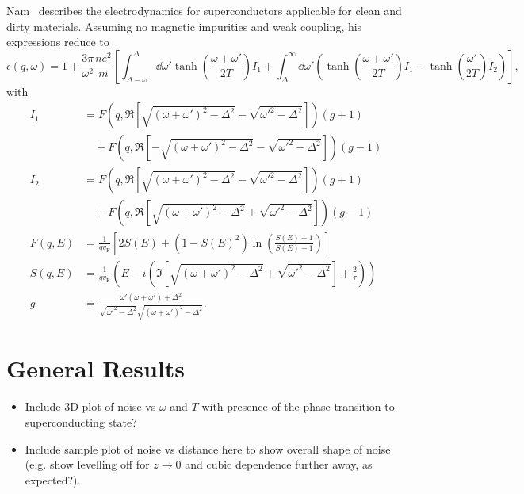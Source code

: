 \documentclass{article}
\newcommand{\vf}{v_{\mathrm{F}}}
\begin{document}
	Nam~\cite{Nam1967} describes the electrodynamics for superconductors applicable for clean and dirty materials.
	Assuming no magnetic impurities and weak coupling, his expressions reduce to
	\begin{equation}
		\epsilon(q, \omega) = 1 + \frac{3 \pi}{\omega^2} \frac{n e^2}{m} \left[\int_{\Delta - \omega}^{\Delta}\dd{\omega'} \tanh(\frac{\omega + \omega'}{2 T}) I_1 + \int_{\Delta}^{\infty} \dd{\omega'} \left( \tanh(\frac{\omega + \omega'}{2 T}) I_1  - \tanh(\frac{\omega'}{2 T})I_2 \right) \right],
	\end{equation}
	with
	\begin{align}
		I_1 &= F(q, \Re[\sqrt{(\omega + \omega')^2 - \Delta^2} - \sqrt{\omega'^2 - \Delta^2}]) (g + 1) \nonumber\\
		&\quad + F(q, \Re[-\sqrt{(\omega + \omega')^2 - \Delta^2} - \sqrt{\omega'^2 - \Delta^2}]) (g - 1) \\
		I_2 &= F(q, \Re[\sqrt{(\omega + \omega')^2 - \Delta^2} - \sqrt{\omega'^2 - \Delta^2}]) (g + 1) \nonumber\\
		&\quad + F(q, \Re[\sqrt{(\omega +  \omega')^2 - \Delta^2} + \sqrt{\omega'^2 - \Delta^2}]) (g - 1) \\
		F(q, E) &= \frac{1}{q \vf} \left[2 S(E) + (1 - S(E)^2)\ln(\frac{S(E) + 1}{S(E) - 1})\right]  \\
		S(q, E) &= \frac{1}{q \vf} \left( E - i \left(\Im[\sqrt{(\omega + \omega')^2 - \Delta^2} + \sqrt{\omega'^2 - \Delta^2}] + \frac{2}{\tau} \right) \right) \\
		g &= \frac{\omega' \left(\omega + \omega'\right) + \Delta^2}{\sqrt{\omega'^2 - \Delta^2}\sqrt{(\omega + \omega')^2 - \Delta^2}}.
	\end{align}


\section{General Results}



\begin{itemize}
	\item Include 3D plot of noise vs $\omega$ and $T$ with presence of the phase transition to superconducting state?
	\item Include sample plot of noise vs distance here to show overall shape of noise (e.g. show levelling off for $z \rightarrow 0$ and cubic dependence further away, as expected?).
\end{itemize}
\end{document}
